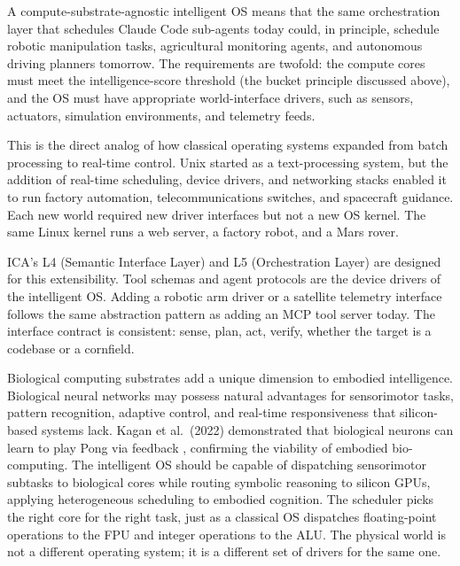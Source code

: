 A compute-substrate-agnostic intelligent OS means that the same orchestration layer that schedules Claude Code sub-agents today could, in principle, schedule robotic manipulation tasks, agricultural monitoring agents, and autonomous driving planners tomorrow. The requirements are twofold: the compute cores must meet the intelligence-score threshold (the bucket principle discussed above), and the OS must have appropriate world-interface drivers, such as sensors, actuators, simulation environments, and telemetry feeds.

This is the direct analog of how classical operating systems expanded from batch processing to real-time control. Unix started as a text-processing system, but the addition of real-time scheduling, device drivers, and networking stacks enabled it to run factory automation, telecommunications switches, and spacecraft guidance. Each new world required new driver interfaces but not a new OS kernel. The same Linux kernel runs a web server, a factory robot, and a Mars rover.

ICA's L4 (Semantic Interface Layer) and L5 (Orchestration Layer) are designed for this extensibility. Tool schemas and agent protocols are the device drivers of the intelligent OS. Adding a robotic arm driver or a satellite telemetry interface follows the same abstraction pattern as adding an MCP tool server today. The interface contract is consistent: sense, plan, act, verify, whether the target is a codebase or a cornfield.

Biological computing substrates add a unique dimension to embodied intelligence. Biological neural networks may possess natural advantages for sensorimotor tasks, pattern recognition, adaptive control, and real-time responsiveness that silicon-based systems lack. Kagan et al.\ (2022) demonstrated that biological neurons can learn to play Pong via feedback \cite{kagan_2022_pong_bioneurons}, confirming the viability of embodied bio-computing. The intelligent OS should be capable of dispatching sensorimotor subtasks to biological cores while routing symbolic reasoning to silicon GPUs, applying heterogeneous scheduling to embodied cognition. The scheduler picks the right core for the right task, just as a classical OS dispatches floating-point operations to the FPU and integer operations to the ALU. The physical world is not a different operating system; it is a different set of drivers for the same one.

